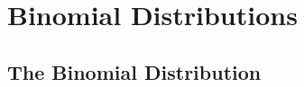 \documentclass[../maths.tex]{subfiles}
\begin{document}
\chapter{Binomial Distributions}
\section{The Binomial Distribution}
\end{document}
